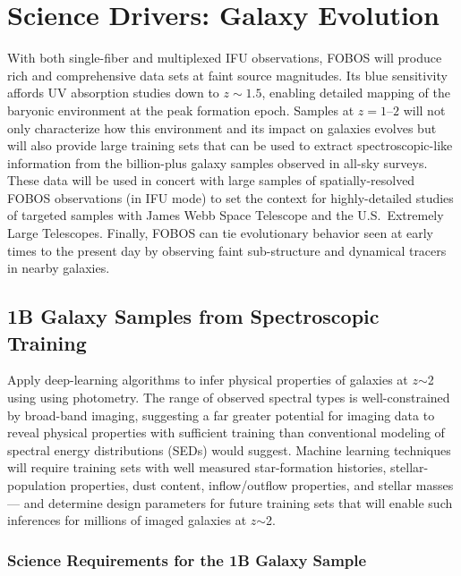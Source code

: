 \documentclass[11pt,a4paper,twoside,onecolumn,openany,final,oldfontcommands]{memoir}
\begin{document}
\newpage

\chapter{Science Drivers: Galaxy Evolution} \label{sci:galaxies}

With both single-fiber and multiplexed IFU observations, FOBOS will produce rich and comprehensive data sets at faint source magnitudes.  Its blue sensitivity affords UV absorption studies down to $z \sim 1.5$, enabling detailed mapping of the baryonic environment at the peak formation epoch.  Samples at $z=1$--$2$ will not only characterize how this environment and its impact on galaxies evolves but will also provide large training sets that can be used to extract spectroscopic-like information from the billion-plus galaxy samples observed in all-sky surveys.  These data will be used in concert with large samples of spatially-resolved FOBOS observations (in IFU mode) to set the context for highly-detailed studies of targeted samples with James Webb Space Telescope and the U.S.~Extremely Large Telescopes.  Finally, FOBOS can tie evolutionary behavior seen at early times to the present day by observing faint sub-structure and dynamical tracers in nearby galaxies.

\section{1B Galaxy Samples from Spectroscopic Training}
\label{sci:1Bgalaxies}

Apply deep-learning algorithms to infer physical properties of galaxies at $z$$\sim$2 using using photometry. The range of observed spectral types is well-constrained by broad-band imaging, suggesting a far greater potential for imaging data to reveal physical properties with sufficient training than conventional modeling of spectral energy distributions (SEDs) would suggest.  Machine learning techniques will require training sets with well measured star-formation histories, stellar-population properties, dust content, inflow/outflow properties, and stellar masses --- and determine design parameters for future training sets that will enable such inferences for millions of imaged galaxies at $z$$\sim$2. 

\subsection{Science Requirements for the 1B Galaxy Sample}
\end{document}
